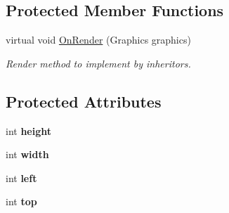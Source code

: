 \subsection*{Protected Member Functions}
\begin{DoxyCompactItemize}
\item 
virtual void \hyperlink{class_msdn_1_1_u_i_framework_1_1_u_i_element_a20b2245806231553935896fe7731812b}{OnRender} (Graphics graphics)
\begin{DoxyCompactList}\small\item\em Render method to implement by inheritors. \item\end{DoxyCompactList}\end{DoxyCompactItemize}
\subsection*{Protected Attributes}
\begin{DoxyCompactItemize}
\item 
\hypertarget{class_msdn_1_1_u_i_framework_1_1_u_i_element_a914cb26535a1963efd0d5b33067b6b2e}{
int {\bfseries height}}
\label{class_msdn_1_1_u_i_framework_1_1_u_i_element_a914cb26535a1963efd0d5b33067b6b2e}

\item 
\hypertarget{class_msdn_1_1_u_i_framework_1_1_u_i_element_a300c1ddd3679217e9b59494dd4ff73cd}{
int {\bfseries width}}
\label{class_msdn_1_1_u_i_framework_1_1_u_i_element_a300c1ddd3679217e9b59494dd4ff73cd}

\item 
\hypertarget{class_msdn_1_1_u_i_framework_1_1_u_i_element_a806c59f7c745af32f7e1e96b1f3f79a3}{
int {\bfseries left}}
\label{class_msdn_1_1_u_i_framework_1_1_u_i_element_a806c59f7c745af32f7e1e96b1f3f79a3}

\item 
\hypertarget{class_msdn_1_1_u_i_framework_1_1_u_i_element_a92178ef5ce195b44180135041eda7e41}{
int {\bfseries top}}
\label{class_msdn_1_1_u_i_framework_1_1_u_i_element_a92178ef5ce195b44180135041eda7e41}

\end{DoxyCompactItemize}
